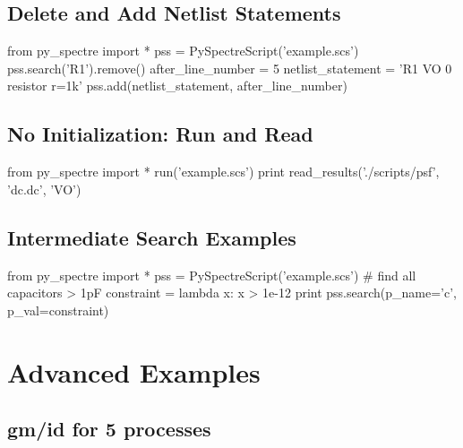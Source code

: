 \documentclass[a4paper,12pt]{article}
\begin{document}
\subsection{Delete and Add Netlist Statements}
\begin{python}
from py_spectre import *
pss = PySpectreScript('example.scs')
pss.search('R1').remove()
after_line_number = 5
netlist_statement = 'R1 VO 0 resistor r=1k'
pss.add(netlist_statement, after_line_number)
\end{python}

\subsection{No Initialization: Run and Read}
\begin{python}
from py_spectre import *
run('example.scs')
print read_results('./scripts/psf', 'dc.dc', 'VO')
\end{python}

\subsection{Intermediate Search Examples}
\begin{python}
from py_spectre import *
pss = PySpectreScript('example.scs')
# find all capacitors > 1pF
constraint = lambda x: x > 1e-12
print pss.search(p_name='c', p_val=constraint)
\end{python}


\newpage
\section{Advanced Examples}
\subsection{gm/id for 5 processes}

\newpage
\end{document}
